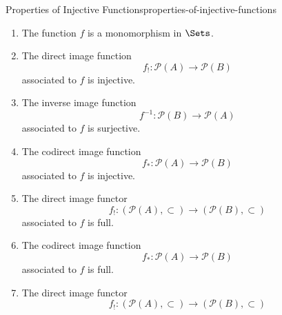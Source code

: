 \begin{proposition}{Properties of Injective Functions}{properties-of-injective-functions}
\begin{enumerate}
\begin{enumerate}
                \item\label{properties-of-injective-functions-characterisations-2}The function $f$ is a monomorphism in $\Sets$.
                \item\label{properties-of-injective-functions-characterisations-3}The direct image function
                    \[
                        f_{!}%
                        \colon%
                        \mathcal{P}(A)%
                        \to%
                        \mathcal{P}(B)%
                    \]%
                    associated to $f$ is injective.
                \item\label{properties-of-injective-functions-characterisations-4}The inverse image function
                    \[
                        f^{-1}%
                        \colon%
                        \mathcal{P}(B)%
                        \to%
                        \mathcal{P}(A)%
                    \]%
                    associated to $f$ is surjective.
                \item\label{properties-of-injective-functions-characterisations-5}The codirect image function
                    \[
                        f_{*}%
                        \colon%
                        \mathcal{P}(A)%
                        \to%
                        \mathcal{P}(B)%
                    \]%
                    associated to $f$ is injective.
                \item\label{properties-of-injective-functions-characterisations-6}The direct image functor
                    \[
                        f_{!}%
                        \colon%
                        (\mathcal{P}(A),\subset)%
                        \to%
                        (\mathcal{P}(B),\subset)%
                    \]%
                    associated to $f$ is full.
                \item\label{properties-of-injective-functions-characterisations-7}The codirect image function
                    \[
                        f_{*}%
                        \colon%
                        \mathcal{P}(A)%
                        \to%
                        \mathcal{P}(B)%
                    \]%
                    associated to $f$ is full.
                \item\label{properties-of-injective-functions-characterisations-8}The direct image functor
                    \[
                        f_{!}%
                        \colon%
                        (\mathcal{P}(A),\subset)%
                        \to%
                        (\mathcal{P}(B),\subset)%
\]
\end{enumerate}
\end{enumerate}
\end{proposition}
